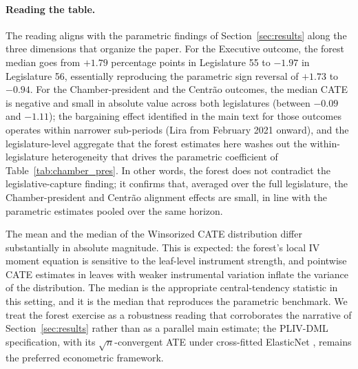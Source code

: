 \documentclass[preprint,12pt,authoryear]{elsarticle}
\begin{document}
\paragraph{Reading the table.} The reading aligns with the parametric findings of Section~\ref{sec:results} along the three dimensions that organize the paper. For the Executive outcome, the forest median goes from $+1.79$ percentage points in Legislature 55 to $-1.97$ in Legislature 56, essentially reproducing the parametric sign reversal of $+1.73$ to $-0.94$. For the Chamber-president and the Centr\~ao outcomes, the median CATE is negative and small in absolute value across both legislatures (between $-0.09$ and $-1.11$); the bargaining effect identified in the main text for those outcomes operates within narrower sub-periods (Lira from February 2021 onward), and the legislature-level aggregate that the forest estimates here washes out the within-legislature heterogeneity that drives the parametric coefficient of Table~\ref{tab:chamber_pres}. In other words, the forest does not contradict the legislative-capture finding; it confirms that, averaged over the full legislature, the Chamber-president and Centr\~ao alignment effects are small, in line with the parametric estimates pooled over the same horizon.

The mean and the median of the Winsorized CATE distribution differ substantially in absolute magnitude. This is expected: the forest's local IV moment equation is sensitive to the leaf-level instrument strength, and pointwise CATE estimates in leaves with weaker instrumental variation inflate the variance of the distribution. The median is the appropriate central-tendency statistic in this setting, and it is the median that reproduces the parametric benchmark. We treat the forest exercise as a robustness reading that corroborates the narrative of Section~\ref{sec:results} rather than as a parallel main estimate; the PLIV-DML specification, with its $\sqrt{n}$-convergent ATE under cross-fitted ElasticNet \citep{Chernozhukov2018}, remains the preferred econometric framework.
\end{document}
